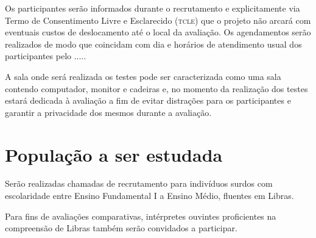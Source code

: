 \documentclass[a4paper,11pt,titlepage,singlespacing]{article}
\begin{document}
Os participantes serão informados durante o recrutamento e explicitamente via Termo de Consentimento Livre e Esclarecido (\textsc{tcle}) que o projeto não arcará com eventuais custos de deslocamento até o local da avaliação. Os agendamentos serão realizados de modo que coincidam com dia e horários de atendimento usual dos participantes pelo .....

A sala onde será realizada os testes pode ser caracterizada como uma sala contendo computador, monitor e cadeiras e, no momento da realização dos testes estará dedicada à avaliação a fim de evitar distrações para os participantes e garantir a privacidade dos mesmos durante a avaliação.

\section{População a ser estudada}

Serão realizadas chamadas de recrutamento para indivíduos surdos com escolaridade entre Ensino Fundamental I a Ensino Médio, fluentes em Libras.






Para fins de avaliações comparativas, intérpretes ouvintes proficientes na compreensão de Libras também serão convidados a participar.




\end{document}
